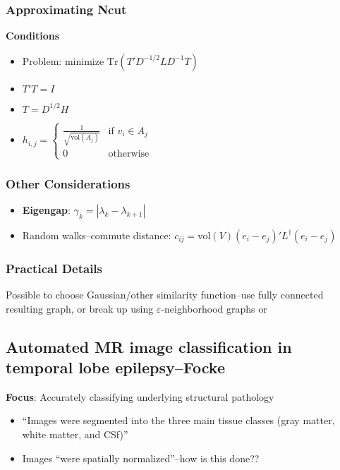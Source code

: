 \documentclass{article}
\begin{document}
{        \subsubsection{Approximating Ncut}
            
            \textbf{Conditions}
            \begin{itemize}            
                \item Problem: minimize \ensuremath{\text{Tr}(T'D^{-1/2}LD^{-1}T)}
                \item \ensuremath{T'T = I}
                \item \ensuremath{T=D^{1/2}H}
                \item \begin{math}
                        h_{i,j} = \left\{
                            \begin{array}{lr}
                            \frac{1}{\sqrt{\text{vol}(A_j)}}&\text{if } v_i \in    
A_j\\
                            0&\text{otherwise}
                            \end{array}\right. 
                \end{math}
            \end{itemize}

        \subsubsection{Other Considerations}
             \begin{itemize}
                    \item \textbf{Eigengap}: \ensuremath{\gamma_k =
|\lambda_k-\lambda_{k+1}|}
                    \item Random walks--commute distance: \ensuremath{ c_{ij} =
\text{vol}(V) (e_i - e_j)' L^{\dagger} (e_i - e_j)}
             \end{itemize}
        \subsubsection{Practical Details}
              Possible to choose Gaussian/other similarity function--use fully
connected resulting graph, or break up using
\ensuremath{\varepsilon}-neighborhood graphs or  
        \subsection{Automated MR image classification in temporal lobe
epilepsy--Focke}
            \textbf{Focus}: Accurately classifying underlying structural
pathology
            \begin{itemize}
                \item ``Images were segmented into the three main tissue classes
(gray matter, white matter, and CSf)''
                \item Images ``were spatially normalized''--how is this done??
            \end{itemize}     
                
}
\end{document}
